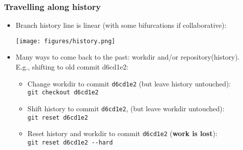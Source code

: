 \documentclass[xcolor=dvipsnames,10pt]{beamer}
\begin{document}
\begin{frame}
 \frametitle{Travelling along history}
 
 \begin{itemize}
 
  \item Branch history line is linear (with some bifurcations if collaborative):
  
  \texttt{[image: figures/history.png]}
  \vspace*{0.2cm}
  
  \item Many ways to come back to the past: workdir and/or repository(history).\\
  E.g., shifting to old commit d6cd1e2:
  \vspace*{0.2cm}
  
  \begin{minipage}{1.1\textwidth}
  \begin{itemize}
   \item Change workdir to commit \texttt{d6cd1e2} (but leave history untouched):\\
   \texttt{git checkout d6cd1e2}
   \vspace*{0.2cm}
   
   \item Shift history to commit \texttt{d6cd1e2}, (but leave workdir untouched):\\
   \texttt{git reset d6cd1e2}
   \vspace*{0.2cm}
   
   \item Reset history and workdir to commit \texttt{d6cd1e2} ({\color{red}\textbf{work is lost}}):\\
   \texttt{git reset d6cd1e2 -{}-hard}
  \end{itemize}
  \end{minipage}
  
 \end{itemize}

 
\end{frame}
\end{document}

